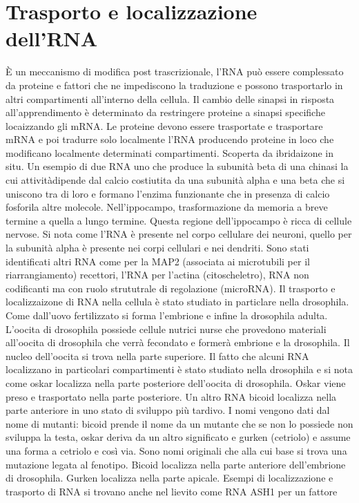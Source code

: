 \chapter{Trasporto e localizzazione dell'RNA}
\`E un meccanismo di modifica post trascrizionale, l'RNA pu\`o essere complessato da proteine e fattori che ne impediscono la traduzione e possono trasportarlo in altri compartimenti 
all'interno della cellula. Il cambio delle sinapsi in risposta all'apprendimento \`e determinato da restringere proteine a sinapsi specifiche locaizzando gli mRNA. Le proteine devono
essere trasportate e trasportare mRNA e poi tradurre solo localmente l'RNA producendo proteine in loco che modificano localmente determinati compartimenti. Scoperta da ibridaizone in 
situ. Un esempio di due RNA uno che produce la subunit\`a beta di una chinasi la cui attivit\` adipende dal calcio costiutita da una subunit\`a alpha e una beta che si uniscono tra
di loro e formano l'enzima funzionante che in presenza di calcio fosforila altre molecole. Nell'ippocampo, trasformazione da memoria a breve termine a quella a lungo termine. Questa 
regione dell'ippocampo \`e ricca di cellule nervose. Si nota come l'RNA \`e presente nel corpo cellulare dei neuroni, quello per la subunit\`a alpha \`e presente nei corpi cellulari e 
nei dendriti. Sono stati identificati altri RNA come per la MAP2 (associata ai microtubili per il riarrangiamento) recettori, l'RNA per l'actina (citoscheletro), RNA non codificanti ma
con ruolo strututrale di regolazione (microRNA). Il trasporto e localizzaizone di RNA nella cellula \`e stato studiato in particlare nella drosophila. Come dall'uovo fertilizzato si 
forma l'embrione e infine la drosophila adulta. L'oocita di drosophila possiede cellule nutrici nurse che provedono materiali all'oocita di drosophila che verr\`a fecondato e former\`a
embrione e la drosophila. Il nucleo dell'oocita si trova nella parte superiore. Il fatto che alcuni RNA localizzano in particolari compartimenti \`e stato studiato nella drosophila e 
si nota come oskar localizza nella parte posteriore dell'oocita di drosophila. Oskar viene preso e trasportato nella parte posteriore. Un altro RNA bicoid localizza nella parte anteriore
in uno stato di sviluppo pi\`u tardivo. I nomi vengono dati dal nome di mutanti: bicoid prende il nome da un mutante che se non lo possiede non sviluppa la testa, oskar deriva da un
altro significato e gurken (cetriolo) e assume una forma a cetriolo e cos\`i via. Sono nomi originali che alla cui base si trova una mutazione legata al fenotipo. Bicoid localizza nella
parte anteriore dell'embrione di drosophila. Gurken localizza nella parte apicale. Esempi di localizzazione e trasporto di RNA si trovano anche nel lievito come RNA ASH1 per un fattore 
